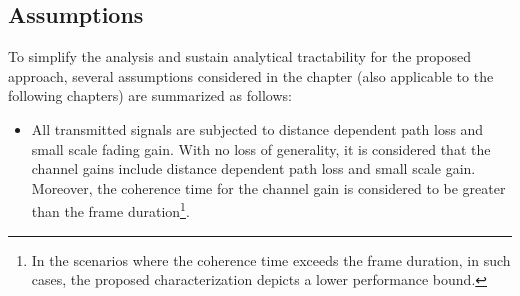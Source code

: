 \subsection{Assumptions}
To simplify the analysis and sustain analytical tractability for the proposed approach, several assumptions considered in the chapter (also applicable to the following chapters) are summarized as follows:
\begin{itemize}
\item All transmitted signals are subjected to distance dependent path loss and small scale fading gain. %
With no loss of generality, it is considered that the channel gains include distance dependent path loss and small scale gain. Moreover, the coherence time for the channel gain is considered to be greater than the frame duration\footnote{In the scenarios where the coherence time exceeds the frame duration, in such cases, the proposed characterization depicts a lower performance bound.}. 

\end{itemize}
